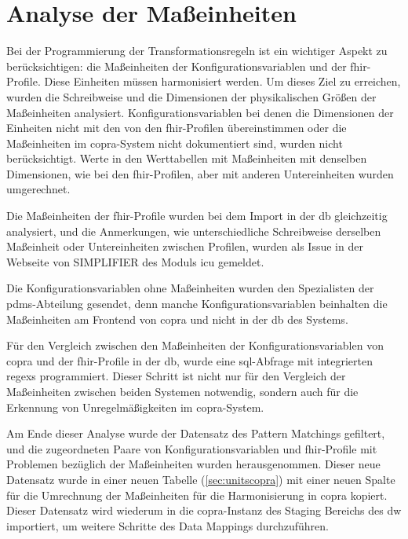 \section{Analyse der Maßeinheiten} \label{sec:units}

Bei der Programmierung der Transformationsregeln ist ein wichtiger Aspekt zu berücksichtigen: die Maßeinheiten der Konfigurationsvariablen und der \ac{fhir}-Profile. Diese Einheiten müssen harmonisiert werden. Um dieses Ziel zu erreichen, wurden die Schreibweise und die Dimensionen der physikalischen Größen der Maßeinheiten analysiert. Konfigurationsvariablen bei denen die Dimensionen der Einheiten nicht mit den von den \ac{fhir}-Profilen übereinstimmen oder die Maßeinheiten im \ac{copra}-System nicht dokumentiert sind, wurden nicht berücksichtigt. Werte in den Werttabellen mit Maßeinheiten mit denselben Dimensionen, wie bei den \ac{fhir}-Profilen, aber mit anderen Untereinheiten wurden umgerechnet.

Die Maßeinheiten der \ac{fhir}-Profile wurden bei dem Import in der \ac{db} gleichzeitig analysiert, und die Anmerkungen, wie unterschiedliche Schreibweise derselben Maßeinheit oder Untereinheiten zwischen Profilen, wurden als Issue in der Webseite von SIMPLIFIER des Moduls \glqq\ac{icu}\grqq{} gemeldet.

Die Konfigurationsvariablen ohne Maßeinheiten wurden den Spezialisten der \ac{pdms}-Abteilung gesendet, denn manche Konfigurationsvariablen beinhalten die Maßeinheiten am Frontend von \ac{copra} und nicht in der \ac{db} des Systems.

Für den Vergleich zwischen den Maßeinheiten der Konfigurationsvariablen von \ac{copra} und der \ac{fhir}-Profile in der \ac{db}, wurde eine \ac{sql}-Abfrage mit integrierten \acp{regex} programmiert. Dieser Schritt ist nicht nur für den Vergleich der Maßeinheiten zwischen beiden Systemen notwendig, sondern auch für die Erkennung von Unregelmäßigkeiten im \ac{copra}-System.

Am Ende dieser Analyse wurde der Datensatz des Pattern Matchings gefiltert, und die zugeordneten Paare von Konfigurationsvariablen und \ac{fhir}-Profile mit Problemen bezüglich der Maßeinheiten wurden herausgenommen. Dieser neue Datensatz wurde in einer neuen Tabelle (\ref{sec:unitscopra}) mit einer neuen Spalte für die Umrechnung der Maßeinheiten für die Harmonisierung in \ac{copra} kopiert. Dieser Datensatz wird wiederum in die \ac{copra}-Instanz des Staging Bereichs des \ac{dw} importiert, um weitere Schritte des Data Mappings durchzuführen.